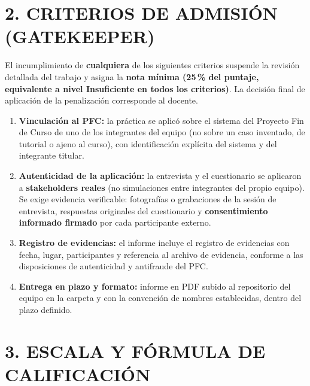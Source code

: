 \documentclass[11pt]{article}
\begin{document}
\section*{\textcolor{utegreendk}{2. CRITERIOS DE ADMISIÓN (GATEKEEPER)}}

\begin{tcolorbox}[colback=lightred,colframe=red!60!black,
  title=\textbf{CRITERIOS DE ADMISIÓN --- verificación previa a la revisión},
  fonttitle=\bfseries,boxrule=0.8pt,arc=2mm]
El incumplimiento de \textbf{cualquiera} de los siguientes criterios suspende la revisión detallada del trabajo y asigna la \textbf{nota mínima (25\,\% del puntaje, equivalente a nivel Insuficiente en todos los criterios)}. La decisión final de aplicación de la penalización corresponde al docente.
\begin{enumerate}[leftmargin=18pt,itemsep=2pt]
  \item \textbf{Vinculación al PFC:} la práctica se aplicó sobre el sistema del Proyecto Fin de Curso de uno de los integrantes del equipo (no sobre un caso inventado, de tutorial o ajeno al curso), con identificación explícita del sistema y del integrante titular.
  \item \textbf{Autenticidad de la aplicación:} la entrevista y el cuestionario se aplicaron a \textbf{stakeholders reales} (no simulaciones entre integrantes del propio equipo). Se exige evidencia verificable: fotografías o grabaciones de la sesión de entrevista, respuestas originales del cuestionario y \textbf{consentimiento informado firmado} por cada participante externo.
  \item \textbf{Registro de evidencias:} el informe incluye el registro de evidencias con fecha, lugar, participantes y referencia al archivo de evidencia, conforme a las disposiciones de autenticidad y antifraude del PFC.
  \item \textbf{Entrega en plazo y formato:} informe en PDF subido al repositorio del equipo en la carpeta y con la convención de nombres establecidas, dentro del plazo definido.
\end{enumerate}
\end{tcolorbox}

\section*{\textcolor{utegreendk}{3. ESCALA Y FÓRMULA DE CALIFICACIÓN}}
\end{document}
